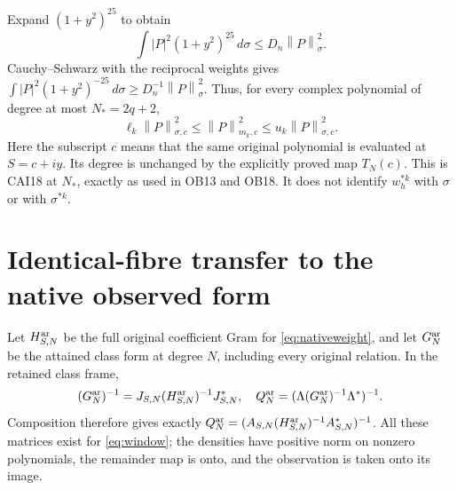 \documentclass[11pt]{article}
\newcommand{\norm}[1]{\left\lVert#1\right\rVert}
\begin{document}
Expand $(1+y^2)^{25}$ to obtain
\[
 \int|P|^2(1+y^2)^{25}\,d\sigma\le D_n\norm P_\sigma^2.
\]
Cauchy--Schwarz with the reciprocal weights gives
$\int|P|^2(1+y^2)^{-25}\,d\sigma\ge D_n^{-1}\norm P_\sigma^2$.
Thus, for every complex polynomial of degree at most $N_*=2q+2$,
\begin{equation}\label{eq:nativecomparison}
 \boxed{\ell_k\norm{P}_{\sigma,c}^{2}
       \le\norm{P}_{m_k,c}^{2}
       \le u_k\norm{P}_{\sigma,c}^{2}.}
\end{equation}
Here the subscript $c$ means that the same original polynomial is
evaluated at $S=c+iy$.  Its degree is unchanged by the explicitly
proved map $T_N(c)$.  This is CAI18 at $N_*$, exactly as used in
OB13 and OB18.  It does not identify $w_h^{*k}$ with $\sigma$ or with
$\sigma^{*k}$.

\section{Identical-fibre transfer to the native observed form}

Let $H_{S,N}^{\rm ar}$ be the full original coefficient Gram for
\eqref{eq:nativeweight}, and let $G_N^{\rm ar}$ be the attained class
form at degree $N$, including every original relation.  In the retained
class frame,
\[
 (G_N^{\rm ar})^{-1}
 =J_{S,N}(H_{S,N}^{\rm ar})^{-1}J_{S,N}^*,\quad
 Q_N^{\rm ar}=(\Lambda(G_N^{\rm ar})^{-1}\Lambda^*)^{-1}.
\]
Composition therefore gives exactly
$Q_N^{\rm ar}=(A_{S,N}(H_{S,N}^{\rm ar})^{-1}A_{S,N}^*)^{-1}$.
All these matrices exist for \eqref{eq:window}; the densities have
positive norm on nonzero polynomials, the remainder map is onto, and
the observation is taken onto its image.
\end{document}
